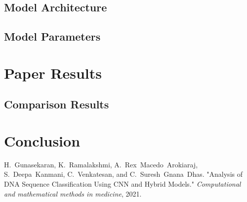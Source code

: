 \documentclass[journal]{IEEEtran}
\begin{document}
\subsection{Model Architecture}
\lipsum[1] %

\subsection{Model Parameters}
\lipsum[1] %

\section{Paper Results}
\lipsum[1] %

\subsection{Comparison Results}
\lipsum[1] %

\section{Conclusion}
\lipsum[1] %

\begin{thebibliography}{1}

H.~Gunasekaran, K.~Ramalakshmi, A.~Rex~Macedo~Arokiaraj, S.~Deepa~Kanmani, C.~Venkatesan, and C.~Suresh~Gnana~Dhas.
  "Analysis of DNA Sequence Classification Using CNN and Hybrid Models." 
  \emph{Computational and mathematical methods in medicine}, 2021.
\end{thebibliography}
\end{document}
